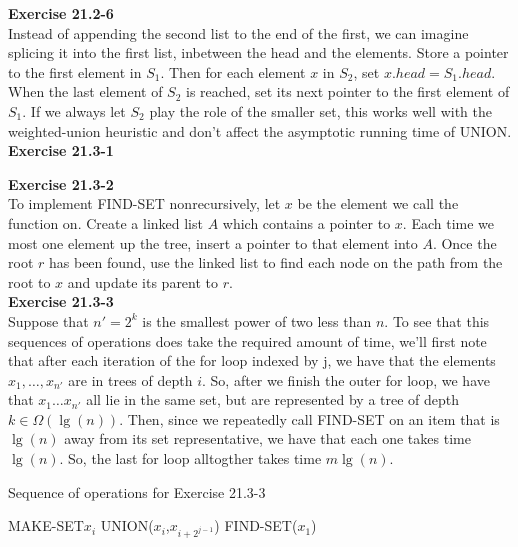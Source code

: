 \documentclass{article}
\begin{document}
\noindent\textbf{Exercise 21.2-6}\\

Instead of appending the second list to the end of the first, we can imagine splicing it into the first list, inbetween the head and the elements.  Store a pointer to the first element in $S_1$.  Then for each element $x$ in $S_2$, set $x.head = S_1.head$.  When the last element of $S_2$ is reached, set its next pointer to the first element of $S_1$.  If we always let $S_2$ play the role of the smaller set, this works well with the weighted-union heuristic and don't affect the asymptotic running time of UNION. \\

\noindent\textbf{Exercise 21.3-1}\\


\noindent\textbf{Exercise 21.3-2}\\

To implement FIND-SET nonrecursively, let $x$ be the element we call the function on.  Create a linked list $A$ which contains a pointer to $x$.  Each time we most one element up the tree, insert a pointer to that element into $A$.  Once the root $r$ has been found, use the linked list to find each node on the path from the root to $x$ and update its parent to $r$.  \\

\noindent\textbf{Exercise 21.3-3}\\

Suppose that $n' =2^k$ is the smallest power of two less than $n$. To see that this sequences of operations does take the required amount of time, we'll first note that after each iteration of the for loop indexed by j, we have that the elements $x_1,\ldots,x_{n'}$ are in trees of depth $i$. So, after we finish the outer for loop, we have that $x_1 \ldots x_{n'}$ all lie in the same set, but are represented by a tree of depth $k\in \Omega(\lg(n))$. Then, since we repeatedly call FIND-SET on an item that is $\lg(n)$ away from its set representative, we have that each one takes time $\lg(n)$. So, the last for loop alltogther takes time $m\lg(n)$.\\
\begin{algorithm}
\caption{Sequence of operations for Exercise 21.3-3}
\begin{algorithmic}
\State MAKE-SET{$x_i$}
\EndFor
{}
\State UNION($x_i$,$x_{i+2^{j-1}}$)
\EndFor
\EndFor
{}
\State FIND-SET($x_1$)
\EndFor
\end{algorithmic}
\end{algorithm}
\end{document}
